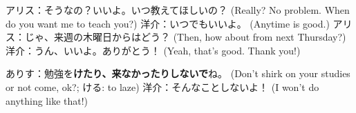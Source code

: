 \documentclass[../nihongo-gakushuu-kyouzai-grammar.tex]{subfiles}
\begin{document}
\begin{itemize}
    アリス：そうなの？いいよ。いつ教えてほしいの？ (Really? No problem. When do you want me to teach you?)
    洋介：いつでもいいよ。 (Anytime is good.)
    アリス：じゃ、来週の木曜日からはどう？ (Then, how about from next Thursday?)
    洋介：うん、いいよ。ありがとう！ (Yeah, that's good. Thank you!)

    ありす：勉強を\textbf{けたり、来なかったりしないで}ね。 (Don't shirk on your studies or not come, ok?; ける: to laze)
    洋介：そんなことしないよ！ (I won't do anything like that!)
\end{itemize}
\end{document}
